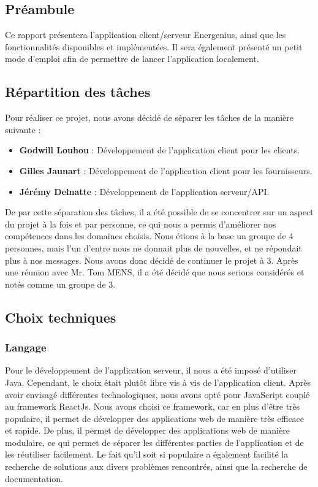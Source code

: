 \documentclass[../rapport.tex]{subfiles}
\begin{document}
\subsection{Préambule}
Ce rapport présentera l'application client/serveur Energenius, ainsi que les fonctionnalités disponibles et implémentées. Il sera également présenté un petit mode d'emploi afin de permettre de lancer l'application localement.

\subsection{Répartition des tâches}
Pour réaliser ce projet, nous avons décidé de séparer les tâches de la manière suivante :
\begin{itemize}
  \item \textbf{Godwill Louhou} : Développement de l'application client pour les clients. 
  \item \textbf{Gilles Jaunart} : Développement de l'application client pour les fournisseurs.
  \item \textbf{Jérémy Delnatte} : Développement de l'application serveur/API.
\end{itemize}

De par cette séparation des tâches, il a été possible de se concentrer sur un aspect du projet à la fois et par personne, ce qui nous a permis d'améliorer nos compétences dans les domaines choisis. Nous étions à la base un groupe de 4 personnes, mais l'un d'entre nous ne donnait plus de nouvelles, et ne répondait plus à nos messages. Nous avons donc décidé de continuer le projet à 3. Après une réunion avec Mr. Tom \textsc{MENS}, il a été décidé que nous serions considérés et notés comme un groupe de 3.

\subsection{Choix techniques}
\subsubsection{Langage}
Pour le développement de l'application serveur, il nous a été imposé d'utiliser Java. Cependant, le choix était plutôt libre vis à vis de l'application client. Après avoir envisagé différentes technologiques, nous avons opté pour JavaScript couplé au framework ReactJs. Nous avons choisi ce framework, car en plus d'être très populaire, il permet de développer des applications web de manière très efficace et rapide. De plus, il permet de développer des applications web de manière modulaire, ce qui permet de séparer les différentes parties de l'application et de les réutiliser facilement. Le fait qu'il soit si populaire a également facilité la recherche de solutions aux divers problèmes rencontrés, ainsi que la recherche de documentation.  
\end{document}
